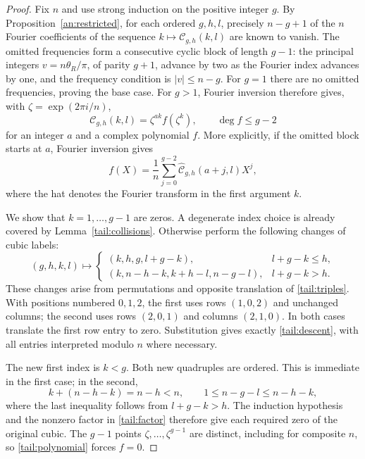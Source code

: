 \documentclass[11pt]{article}
\numberwithin{equation}{section}
\theoremstyle{definition}
\theoremstyle{remark}
\begin{document}
\begin{proof}
Fix $n$ and use strong induction on the positive integer $g$. By
Proposition~\ref{an:restricted}, for each ordered $g,h,l$, precisely
$n-g+1$ of the $n$ Fourier coefficients of the sequence
$k\mapsto\mathcal C_{g,h}(k,l)$ are known to vanish.
The omitted frequencies form a consecutive cyclic block of
length $g-1$: the principal integers $v=n\theta_R/\pi$,
of parity $g+1$, advance by two as the Fourier index advances
by one, and the frequency condition is $|v|\le n-g$.
For $g=1$ there are no omitted frequencies, proving the base case.
For $g>1$, Fourier inversion therefore gives, with
$\zeta=\exp(2\pi i/n)$,
\begin{equation}\label{tail:polynomial}
 \mathcal C_{g,h}(k,l)=\zeta^{ak}f(\zeta^k),\qquad
                         \deg f\le g-2
\end{equation}
for an integer $a$ and a complex polynomial $f$.
More explicitly, if the omitted block starts at $a$, Fourier inversion
gives
\[
 f(X)=\frac1n\sum_{j=0}^{g-2}
          \widehat{\mathcal C}_{g,h}(a+j,l)X^j,
\]
where the hat denotes the Fourier transform in the first argument $k$.

We show that $k=1,\ldots,g-1$ are zeros.  A degenerate index choice is
already covered by Lemma~\ref{tail:collisions}.  Otherwise
perform the following changes of cubic labels:
\begin{equation}\label{tail:descent}
 (g,h,k,l)\longmapsto
 \begin{cases}
 (k,h,g,l+g-k),&l+g-k\le h,\\
 (k,n-h-k,k+h-l,n-g-l),&l+g-k>h.
 \end{cases}
\end{equation}
These changes arise from permutations and opposite translation
of \eqref{tail:triples}.  With positions numbered $0,1,2$,
the first uses rows $(1,0,2)$ and unchanged columns; the second
uses rows $(2,0,1)$ and columns $(2,1,0)$.  In both cases
translate the first row entry to zero.  Substitution gives
exactly \eqref{tail:descent}, with all entries interpreted
modulo $n$ where necessary.

The new first index is $k<g$.  Both new quadruples are ordered.
This is immediate in the first case; in the second,
\[
 k+(n-h-k)=n-h<n,\qquad
 1\le n-g-l\le n-h-k,
\]
where the last inequality follows from $l+g-k>h$.
The induction hypothesis and the nonzero factor in
\eqref{tail:factor} therefore give each required zero of the
original cubic.  The $g-1$ points
$\zeta,\ldots,\zeta^{g-1}$ are distinct, including for
composite $n$, so \eqref{tail:polynomial} forces $f=0$.
\end{proof}
\end{document}
